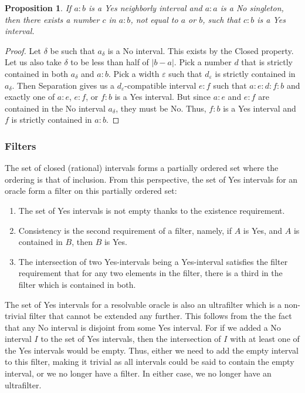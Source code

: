 \documentclass[12pt]{article}
\newtheorem{proposition}{Proposition}[subsection]
\begin{document}
\begin{proposition}\label{pr:exclude-singleton}
    If $a : b$ is a Yes neighborly interval  and $a:a$ is a No singleton, then there exists a number $c$ in $a:b$, not equal to $a$ or $b$, such that $c : b$ is a Yes interval.
\end{proposition}

\begin{proof}
    Let $\delta$ be such that $a_\delta$ is a No interval. This exists by the Closed property. Let us also take $\delta$ to be less than half of $|b-a|$. Pick a number $d$ that is strictly contained in both $a_\delta$ and $a:b$. Pick a width $\varepsilon$ such that $d_\varepsilon$ is strictly contained in $a_\delta$. Then Separation gives us a $d_\varepsilon$-compatible interval $e:f$ such that $a:e:d:f:b$ and exactly one of $a:e$, $e:f$, or $f:b$ is a Yes interval. But since $a:e$ and $e:f$ are contained in the No interval $a_\delta$, they must be No. Thus, $f:b$ is a Yes interval and $f$ is strictly contained in $a:b$.
\end{proof}

\subsubsection{Filters}

The set of closed (rational) intervals forms a partially ordered set where the ordering is that of inclusion. From this perspective, the set of Yes intervals for an oracle form a filter on this partially ordered set: 
\begin{enumerate}
    \item The set of Yes intervals is not empty thanks to the existence requirement. 
    \item Consistency is the second requirement of a filter, namely, if $A$ is Yes, and $A$ is contained in $B$, then $B$ is Yes.
    \item The intersection of two Yes-intervals being a Yes-interval satisfies the filter requirement that for any two elements in the filter, there is a third in the filter which is contained in both. 
\end{enumerate}

 The set of Yes intervals for a resolvable oracle is also an ultrafilter which is a non-trivial filter that cannot be extended any further. This follows from the the fact that any No interval is disjoint from some Yes interval. For if we added a No interval $I$ to the set of Yes intervals, then the intersection of $I$ with at least one of the Yes intervals would be empty. Thus, either we need to add the empty interval to this filter, making it trivial as all intervals could be said to contain the empty interval, or we no longer have a filter. In either case, we no longer have an ultrafilter. 
\end{document}
